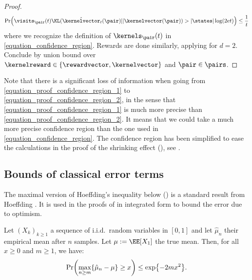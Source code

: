 \documentclass[preprint,cleveref,12pt]{colt2025}
\DeclarePairedDelimiter{\braces}{\{}{\}}	%
\DeclarePairedDelimiter{\parens}{(}{)}	%
\DeclarePairedDelimiter{\abs}{\lvert}{\rvert}	%
\def\kernel{\kernelvector}
\def\kerrew{\kernelreward}
\def\reward{\rewardvector}
\begin{document}
\begin{proof}
\begin{equation}
        \label{equation_proof_confidence_region_2}
            \Pr \parens[\Big]{
                \visits_\pair (t)
                \KL(\hat{\kernel}_t(\pair)||\kernel(\pair))
                >
                \abs{\states} \log(2 e t)
            }
            \le
            \frac 1t
        \end{equation}
        where we recognize the definition of $\kernels_\pair (t)$ in \eqref{equation_confidence_region}. 
        Rewards are done similarly, applying \cite[Proposition~1]{jonsson2020planning} for $d = 2$. 
        Conclude by union bound over $\kerrew \in \braces{\reward, \kernel}$ and $\pair \in \pairs$. 
    \end{proof}
    
    Note that there is a significant loss of information when going from \eqref{equation_proof_confidence_region_1} to \eqref{equation_proof_confidence_region_2}, in the sense that \eqref{equation_proof_confidence_region_1} is much more precise than \eqref{equation_proof_confidence_region_2}. 
    It means that we could take a much more precise confidence region than the one used in \eqref{equation_confidence_region}. 
    The confidence region has been simplified to ease the calculations in the proof of the shrinking effect (), see .

    \subsection{Bounds of classical error terms}
    \label{appendix_bounds_classical_errors}

    The maximal version of Hoeffding's inequality below () is a standard result from Hoeffding \cite{hoeffding_probability_1963}.
    It is used in the proofs of  in integrated form to bound the error due to optimism. 

    \begin{lemma}
    \label{lemma_hoeffding_maximal}
        Let $(X_k)_{k \ge 1}$ a sequence of i.i.d.~random variables in $[0, 1]$ and let $\hat{\mu}_n$ their empirical mean after $n$ samples. 
        Let $\mu := \EE[X_1]$ the true mean.
        Then, for all $x \ge 0$ and $m \ge 1$, we have:
        \begin{equation*}
            \Pr \parens*{
                \max_{n \ge m} \braces*{\hat{\mu}_n - \mu}
                \ge 
                x
            }
            \le 
            \exp \braces*{-2 m x^2}
            .
        \end{equation*}
    \end{lemma}
\end{document}
